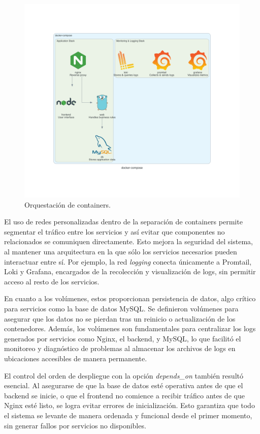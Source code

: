 \begin{figure}[H]
	\centering
	\includegraphics[scale=.29]{./Figures/PortalWeb/docker-compose.png}
	\caption{Orquestación de containers.}
	\label{fig:docker-compose}
\end{figure}

El uso de redes personalizadas dentro de la separación de containers permite segmentar el tráfico entre los servicios y así evitar que componentes no relacionados se comuniquen directamente. Esto mejora la seguridad del sistema, al mantener una arquitectura en la que sólo los servicios necesarios pueden interactuar entre sí. Por ejemplo, la red \textit{logging} conecta únicamente a Promtail, Loki y Grafana, encargados de la recolección y visualización de logs, sin permitir acceso al resto de los servicios.

En cuanto a los volúmenes, estos proporcionan persistencia de datos, algo crítico para servicios como la base de datos MySQL. Se definieron volúmenes para asegurar que los datos no se pierdan tras un reinicio o actualización de los contenedores. Además, los volúmenes son fundamentales para centralizar los logs generados por servicios como Nginx, el backend, y MySQL, lo que facilitó el monitoreo y diagnóstico de problemas al almacenar los archivos de logs en ubicaciones accesibles de manera permanente.

El control del orden de despliegue con la opción \textit{depends\_on} también resultó esencial. Al asegurarse de que la base de datos esté operativa antes de que el backend se inicie, o que el frontend no comience a recibir tráfico antes de que Nginx esté listo, se logra evitar errores de inicialización. Esto garantiza que todo el sistema se levante de manera ordenada y funcional desde el primer momento, sin generar fallos por servicios no disponibles.

